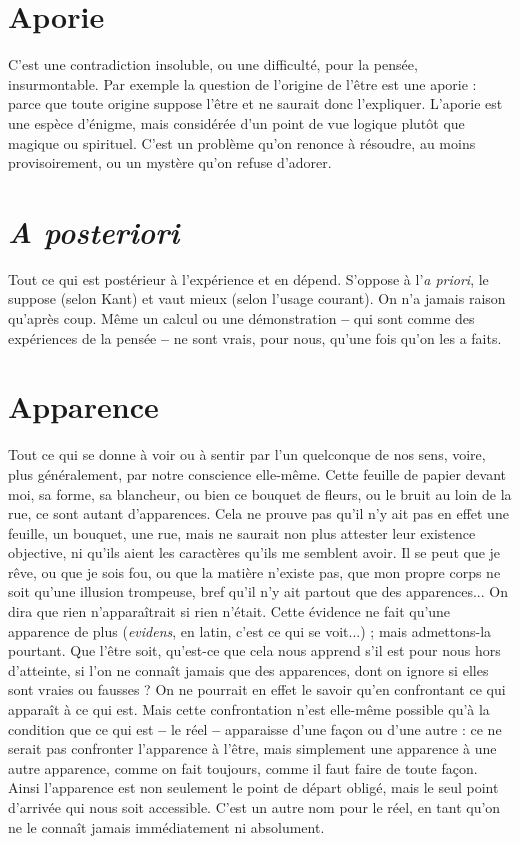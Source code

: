 \section{Aporie}
C'est une contradiction insoluble, ou une difficulté, pour la pensée,
insurmontable. Par exemple la question de l’origine de l’être
est une aporie : parce que toute origine suppose l'être et ne saurait donc
l'expliquer. L’aporie est une espèce d’énigme, mais considérée d’un point de
vue logique plutôt que magique ou spirituel. C’est un problème qu’on
renonce à résoudre, au moins provisoirement, ou un mystère qu’on refuse
d’adorer.

\section{\it A posteriori}
Tout ce qui est postérieur à l’expérience et en dépend.
S’oppose à l’{\it a priori}, le suppose (selon Kant) et vaut mieux
(selon l'usage courant). On n’a jamais raison qu'après coup. Même un calcul
ou une démonstration {\bf --} qui sont comme des expériences de la pensée {\bf --} ne sont
vrais, pour nous, qu’une fois qu’on les a faits.

\section{Apparence}
Tout ce qui se donne à voir ou à sentir par l’un quelconque de
nos sens, voire, plus généralement, par notre conscience
elle-même. Cette feuille de papier devant moi, sa forme, sa blancheur, ou
bien ce bouquet de fleurs, ou le bruit au loin de la rue, ce sont autant
d’apparences. Cela ne prouve pas qu’il n’y ait pas en effet une feuille, un
bouquet, une rue, mais ne saurait non plus attester leur existence objective,
ni qu'ils aient les caractères qu’ils me semblent avoir. Il se peut que je rêve,
ou que je sois fou, ou que la matière n'existe pas, que mon propre corps ne
soit qu’une illusion trompeuse, bref qu’il n’y ait partout que des apparences...
On dira que rien n’apparaîtrait si rien n’était. Cette évidence ne
fait qu’une apparence de plus ({\it evidens}, en latin, c’est ce qui se voit...) ; mais
admettons-la pourtant. Que l’être soit, qu'est-ce que cela nous apprend s’il
est pour nous hors d’atteinte, si l’on ne connaît jamais que des apparences,
dont on ignore si elles sont vraies ou fausses ? On ne pourrait en effet le
savoir qu’en confrontant ce qui apparaît à ce qui est. Mais cette confrontation
n’est elle-même possible qu’à la condition que ce qui est {\bf --} le réel {\bf --}
apparaisse d’une façon ou d’une autre : ce ne serait pas confronter l’apparence
à l’être, mais simplement une apparence à une autre apparence,
comme on fait toujours, comme il faut faire de toute façon. Ainsi l’apparence
est non seulement le point de départ obligé, mais le seul point
d'arrivée qui nous soit accessible. C’est un autre nom pour le réel, en tant
qu'on ne le connaît jamais immédiatement ni absolument.

